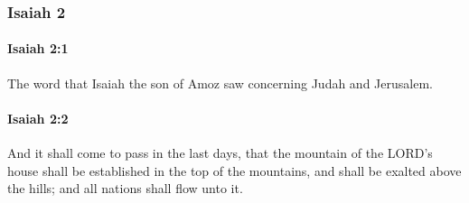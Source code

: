 	\subsubsection{Isaiah 2} %
		\label{ISAIAH-2}

		\paragraph{Isaiah 2:1} %
			\label{ISAIAH-2-1}

			The word that Isaiah the son of Amoz saw concerning Judah and Jerusalem.


		\paragraph{Isaiah 2:2} %
			\label{ISAIAH-2-2}

			And it shall come to pass in the last days, that the mountain of the LORD's house shall be established in the top of the mountains, and shall be exalted above the hills; and all nations shall flow unto it.

